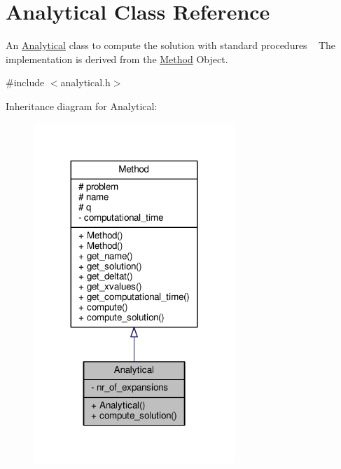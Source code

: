 \hypertarget{classAnalytical}{}\section{Analytical Class Reference}
\label{classAnalytical}


An \hyperlink{classAnalytical}{Analytical} class to compute the solution with standard procedures ~\newline
 The implementation is derived from the \hyperlink{classMethod}{Method} Object.  




{\ttfamily \#include $<$analytical.\+h$>$}



Inheritance diagram for Analytical\+:
\nopagebreak
\begin{figure}[H]
\begin{center}
\leavevmode
\includegraphics[width=215pt]{classAnalytical__inherit__graph}
\end{center}
\end{figure}


